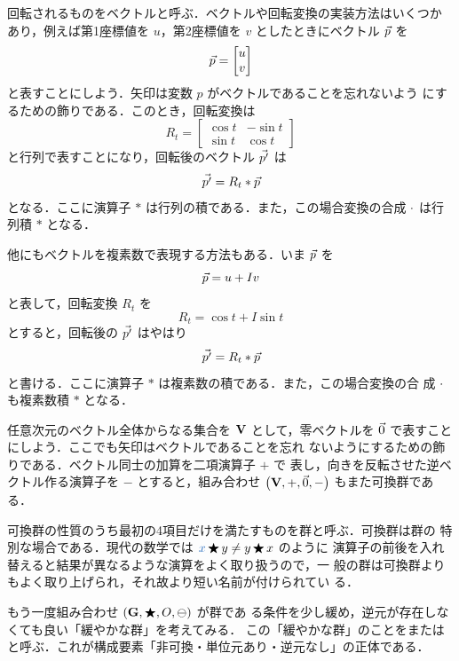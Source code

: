 \documentclass[a5paper,twoside,fleqn,draft]{jsbook}
\begin{document}
回転されるものをベクトルと呼ぶ．ベクトルや回転変換の実装方法はいくつか
あり，例えば第1座標値を $u$，第2座標値を $v$ としたときにベクトル
$\Vec{p}$ を
\begin{equation}
\Vec{p}=\begin{bmatrix}u\\v\end{bmatrix}
\end{equation}
と表すことにしよう．矢印は変数 $p$ がベクトルであることを忘れないよう
にするための飾りである．このとき，回転変換は
\begin{equation}
R_t=\begin{bmatrix}\cos t&-\sin t\\\sin t&\cos t\end{bmatrix}
\end{equation}
と行列で表すことになり，回転後のベクトル $\Vec{p'}$ は
\begin{equation}
\Vec{p'}=R_t*\Vec{p}
\end{equation}
となる．ここに演算子 $*$ は行列の積である．また，この場合変換の合成
$\operatorname{\cdot}$ は行列積 $*$ となる．

他にもベクトルを複素数で表現する方法もある．いま $\Vec{p}$ を
\begin{equation}
\Vec{p}=u+I v
\end{equation}
と表して，回転変換 $R_t$ を
\begin{equation}
R_t=\cos t+I\sin t
\end{equation}
とすると，回転後の $\Vec{p'}$ はやはり
\begin{equation}
\Vec{p'}=R_t*\Vec{p}
\end{equation}
と書ける．ここに演算子 $*$ は複素数の積である．また，この場合変換の合
成 $\operatorname{\cdot}$ も複素数積 $*$ となる．

任意次元のベクトル全体からなる集合を $\mathbf{V}$ として，零ベクトルを
$\Vec{0}$ で表すことにしよう．ここでも矢印はベクトルであることを忘れ
ないようにするための飾りである．ベクトル同士の加算を二項演算子 $+$ で
表し，向きを反転させた逆ベクトル作る演算子を $-$ とすると，組み合わせ
$\left(\mathbf{V},+,\Vec{0},-\right)$ もまた可換群である．

可換群の性質のうち最初の4項目だけを満たすものを群と呼ぶ．可換群は群の
特別な場合である．現代の数学では $\hVar{x}\hAnyBinOp y\neq y\hAnyBinOp x$ のように
演算子の前後を入れ替えると結果が異なるような演算をよく取り扱うので，一
般の群は可換群よりもよく取り上げられ，それ故より短い名前が付けられてい
る．

もう一度組み合わせ $\left(\mathbf{G},\operatorname{\bigstar},O,\operatorname{\ominus}\right)$ が群であ
る条件を少し緩め，逆元が存在しなくても良い「緩やかな群」を考えてみる．
この「緩やかな群」のことをまたは
と呼ぶ．これが構成要素「非可換・単位元あり・逆元なし」の正体である．
\end{document}
